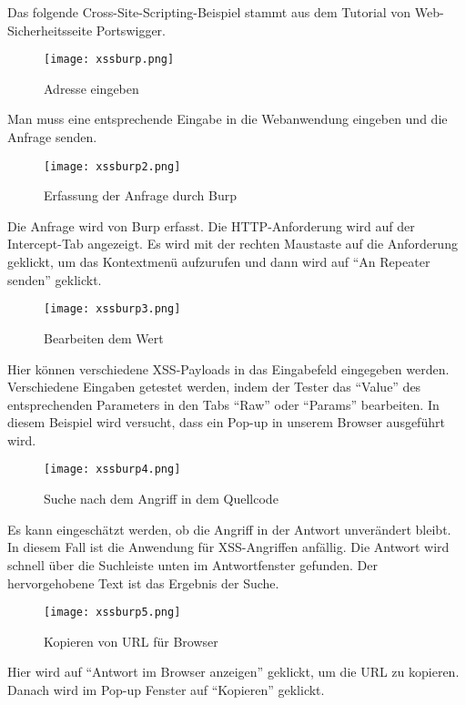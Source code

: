 Das folgende Cross-Site-Scripting-Beispiel stammt aus dem Tutorial von Web-Sicherheitsseite Portswigger\cite{portswigger12}.

\begin{figure}[h]
	\centering
	\texttt{[image: xssburp.png]}
	\caption{Adresse eingeben}
\end{figure}

\newpage

Man muss eine entsprechende Eingabe in die Webanwendung eingeben und die Anfrage senden.

\begin{figure}[h]
	\centering
	\texttt{[image: xssburp2.png]}
	\caption{Erfassung der Anfrage durch Burp}
\end{figure}

Die Anfrage wird von Burp erfasst. Die HTTP-Anforderung wird auf der Intercept-Tab angezeigt. Es wird mit der rechten Maustaste auf die Anforderung geklickt, um das Kontextmenü aufzurufen und dann wird auf "`An Repeater senden"' geklickt.

\begin{figure}[h]
	\centering
	\texttt{[image: xssburp3.png]}
	\caption{Bearbeiten dem Wert}
\end{figure}

Hier können verschiedene XSS-Payloads in das Eingabefeld eingegeben werden. Verschiedene Eingaben getestet werden, indem der Tester das "`Value"' des entsprechenden Parameters in den Tabs "`Raw"' oder "`Params"' bearbeiten. In diesem Beispiel wird versucht, dass ein Pop-up in unserem Browser ausgeführt wird.

\begin{figure}[h]
	\centering
	\texttt{[image: xssburp4.png]}
	\caption{Suche nach dem Angriff in dem Quellcode}
\end{figure}

Es kann eingeschätzt werden, ob die Angriff in der Antwort unverändert bleibt. In diesem Fall ist die Anwendung für XSS-Angriffen anfällig. Die Antwort wird schnell über die Suchleiste unten im Antwortfenster gefunden. Der hervorgehobene Text ist das Ergebnis der Suche.

\begin{figure}[h]
	\centering
	\texttt{[image: xssburp5.png]}
	\caption{Kopieren von URL für Browser}
\end{figure}

Hier wird auf "`Antwort im Browser anzeigen"' geklickt, um die URL zu kopieren. Danach wird im Pop-up Fenster auf "`Kopieren"' geklickt.

